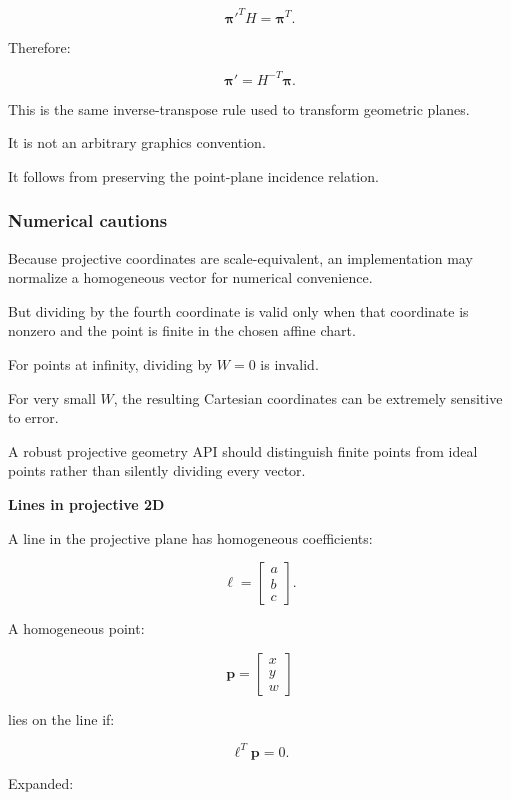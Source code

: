 \[
 \boldsymbol\pi'^TH=\boldsymbol\pi^T.
\]

Therefore:

\[
 \boxed{ \boldsymbol\pi'=H^{-T}\boldsymbol\pi }.
\]

This is the same inverse-transpose rule used to transform geometric planes.

It is not an arbitrary graphics convention.

It follows from preserving the point-plane incidence relation.

\subsubsection{Numerical cautions}\label{02-foundations-ii-ch032-numerical-cautions}

\hypertarget{02-foundations-ii-ch032-numerical-cautions}{}

Because projective coordinates are scale-equivalent, an implementation may normalize a homogeneous vector for numerical convenience.

But dividing by the fourth coordinate is valid only when that coordinate is nonzero and the point is finite in the chosen affine chart.

For points at infinity, dividing by \(W=0\) is invalid.

For very small \(W\), the resulting Cartesian coordinates can be extremely sensitive to error.

A robust projective geometry API should distinguish finite points from ideal points rather than silently dividing every vector.

\textbf{Lines in projective 2D}

A line in the projective plane has homogeneous coefficients:

\[
 \boxed{ \boldsymbol\ell= \begin{bmatrix} a\\b\\c \end{bmatrix} }.
\]

A homogeneous point:

\[
 \mathbf p= \begin{bmatrix} x\\y\\w \end{bmatrix}
\]

lies on the line if:

\[
 \boxed{ \boldsymbol\ell^T\mathbf p=0 }.
\]

Expanded:

